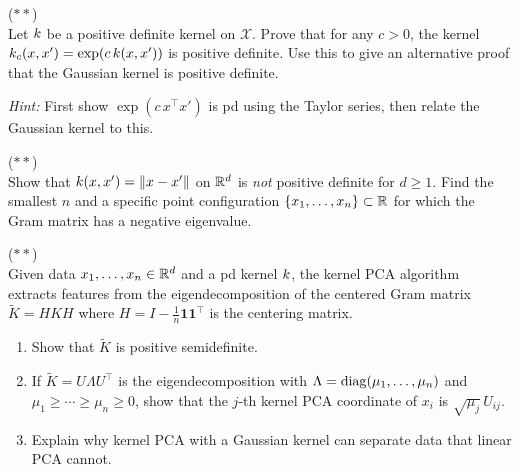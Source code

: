\documentclass[11pt,a4paper]{article}
\begin{document}
\begin{exercise}
\textnormal{(\(**\))} \\
Let $k$ be a positive definite kernel on $\mathcal{X}$.
Prove that for any $c > 0$, the kernel $k_c(x, x') =
\exp(c \, k(x, x'))$ is positive definite. Use this to give
an alternative proof that the Gaussian kernel is positive definite.

\textit{Hint:} First show $\exp(c \, x^\top x')$ is pd using the
Taylor series, then relate the Gaussian kernel to this.
\end{exercise}

\begin{exercise}
\textnormal{(\(**\))} \\
Show that $k(x, x') = \|x - x'\|$ on $\mathbb{R}^d$ is \emph{not}
positive definite for $d \ge 1$. Find the smallest $n$ and a
specific point configuration $\{x_1, \ldots, x_n\} \subset \mathbb{R}$ for
which the Gram matrix has a negative eigenvalue.
\end{exercise}

\begin{exercise}
\textnormal{(\(**\))} \\
Given data $x_1, \ldots, x_n \in \mathbb{R}^d$ and a pd kernel $k$,
the kernel PCA algorithm extracts features from the eigendecomposition
of the centered Gram matrix $\tilde{K} = HKH$ where $H = I -
\frac{1}{n}\mathbf{1}\mathbf{1}^\top$ is the centering matrix.
\begin{enumerate}[label=(\alph*)]
    \item Show that $\tilde{K}$ is positive semidefinite.
    \item If $\tilde{K} = U \Lambda U^\top$ is the eigendecomposition
    with $\Lambda = \operatorname{diag}(\mu_1, \ldots, \mu_n)$ and $\mu_1 \ge \cdots
    \ge \mu_n \ge 0$, show that the $j$-th kernel PCA coordinate of
    $x_i$ is $\sqrt{\mu_j} \, U_{ij}$.
    \item Explain why kernel PCA with a Gaussian kernel can separate
    data that linear PCA cannot.
\end{enumerate}
\end{exercise}
\end{document}
